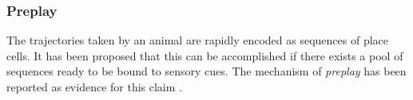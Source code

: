 \subsubsection{Preplay}
The trajectories taken by an animal are rapidly encoded as sequences of place cells. It has been proposed that this can be accomplished if there exists a pool of sequences ready to be bound to sensory cues. The mechanism of \emph{preplay} has been reported as evidence for this claim  \cite{Dragoi2011, Dragoi2013a}. 
